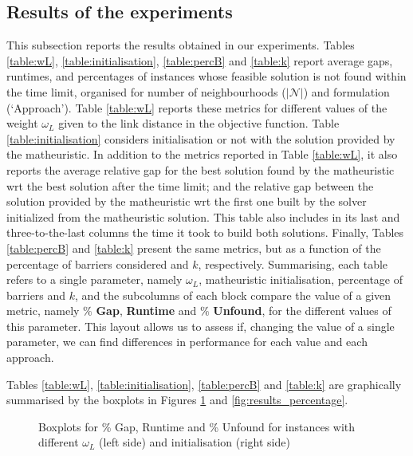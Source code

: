 \documentclass[a4paper,  review, authoryear, 1p.]{elsarticle}
\newcommand{\JP}[1]{{\color{blue}#1}}
\begin{document}
		\subsection{Results of the experiments}
		\JP{This subsection reports the results obtained in our experiments.
		Tables \ref{table:wL}, \ref{table:initialisation}, \ref{table:percB}  and \ref{table:k} report average gaps, runtimes, and percentages of instances whose feasible solution is not found within the time limit, organised for number of neighbourhoods ($| \mathcal{N}|$)  and formulation (`Approach'). Table \ref{table:wL} reports these metrics for different values of the weight $\omega_L$ given to the link distance in the objective function.  Table  \ref{table:initialisation}  considers initialisation or not with the solution provided by the matheuristic. In addition to the metrics reported in Table \ref{table:wL}, it also reports the average relative gap for the best solution found by the matheuristic wrt the best solution after the time limit; and the relative gap between the solution provided by the matheuristic wrt the first one built by the solver initialized from the matheuristic solution. This table also includes in its last and three-to-the-last columns the time it took to build both solutions. Finally, Tables \ref{table:percB} and \ref{table:k}  present the same metrics, but as a function of the percentage of barriers considered and $k$, respectively. Summarising, each table refers to a single parameter, namely $\omega_L$, matheuristic initialisation, percentage of barriers and $k$, and the subcolumns of each block  compare the value of a given metric, namely $\%$ \textbf{Gap}, \textbf{Runtime} and $\%$ \textbf{Unfound}, for the different values of  this parameter. This layout allows us to assess if, changing the value of a single parameter, we can find differences in performance for each value and each approach. }

		
		
		
		
		
		\JP{
		Tables  \ref{table:wL}, \ref{table:initialisation}, \ref{table:percB} and \ref{table:k} are graphically summarised by the boxplots in Figures \ref{fig:results_wL} and \ref{fig:results_percentage}}.

		\begin{figure}[h!]
			\centering
			\caption{Boxplots for \% Gap, Runtime and \% Unfound for instances with different $\omega_L$ (left side) and initialisation (right side)}
			
			\label{fig:results_wL}
			
		\end{figure}
\end{document}
